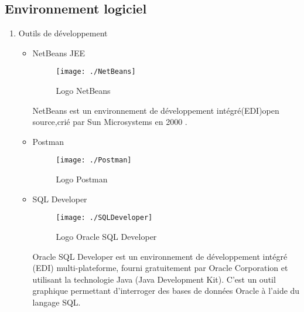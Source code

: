 \subsection{Environnement logiciel}
\begin{enumerate}[label=(\alph*)]

\item{Outils de développement}
\begin{itemize}
\item NetBeans JEE\\

\begin{figure}[!h]
\begin{center}
\texttt{[image: ./NetBeans]}

\caption{Logo NetBeans}
\end{center}
\end{figure}

NetBeans est un environnement de développement intégré(EDI)open source,crié par Sun Microsystems en 2000 \cite{cite1}.

\item Postman


\begin{figure}[!h]
\begin{center}

\texttt{[image: ./Postman]}

\caption{Logo Postman}
\end{center}
\end{figure}


\item SQL Developer


\begin{figure}[!h]
\begin{center}

\texttt{[image: ./SQLDeveloper]}

\caption{Logo Oracle SQL Developer}
\end{center}
\end{figure}



Oracle SQL Developer est un environnement de développement intégré (EDI) multi-plateforme, fourni gratuitement par Oracle Corporation et utilisant la technologie Java (Java Development Kit). C'est un outil graphique permettant d'interroger des bases de données Oracle à l'aide du langage SQL.


\end{itemize}
\end{enumerate}
